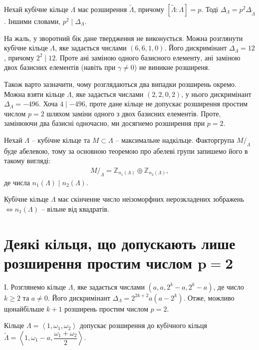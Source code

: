 \documentclass{thesis}
\begin{document}
\begin{proposition}
Нехай кубічне кільце $\Lambda$ має розширення $\tilde{\Lambda}$, причому $[\tilde{\Lambda}: \Lambda] = p$. Тоді $\Delta_\Lambda = p^2 \Delta_{\tilde{\Lambda}}$. Іншими словами, $p^2 \mid \Delta_\Lambda$.
\end{proposition}

На жаль, у зворотний бік дане твердження не виконується. Можна розглянути кубічне кільце $\Lambda$, яке задається числами $(6,6,1,0)$. Його дискримінант $\Delta_\Lambda = 12$, причому $2^2 \mid 12$. Проте ані заміною одного базисного елементу, ані заміною двох базисних елементів (навіть при $\gamma \neq 0$) не виникне розширеня.

Також варто зазначити, чому розглядаються два випадки розширень окремо. Можна взяти кільце $\Lambda$, яке задається числами $(2,2,0,2)$, у нього дискримінант $\Delta_\Lambda = -496$. Хоча $4 \mid -496$, проте дане кільце не допускає розширення простим числом $p=2$ шляхом заміни одного з двох базисних елементів. Проте, замінюючи два базисні одночасно, ми досягнемо розширення при $p=2$.

Нехай $\Lambda$ -- кубічне кільце та $M \subset \Lambda$ -- максимальне надкільце. Факторгрупа $M/_\Lambda$ буде абелевою, тому за основною теоремою про абелеві групи запишемо його в такому вигляді:
\begin{align*}
M/_\Lambda = \mathbb{Z}_{n_1(\Lambda)} \oplus \mathbb{Z}_{n_2(\Lambda)},
\end{align*}
де числа $n_1(\Lambda) \mid n_2(\Lambda)$.

\begin{theorem}
\label{integral_representation_theorem}
Кубічне кільце $\Lambda$ має скінченне число неізоморфних нерозкладених зображень $\iff n_1(\Lambda)$ -- вільне від квадратів.
\end{theorem}

\section{Деякі кільця, що допускають лише розширення простим числом $\boldsymbol{p = 2}$}
I. Розглянемо кільце $\Lambda$, яке задається числами $(a,a,2^k-a,2^k-a)$, де число $k \geq 2$ та $a \neq 0$. Його дискримінант $\Delta_\Lambda = 2^{2k+2}a(a-2^k)$. Отже, можливо щонайбільше $k+1$ розширень простим числом $p = 2$.

\begin{lemma}
Кільце $\Lambda = \left<1,\omega_1,\omega_2\right>$ допускає розширення до кубічного кільця $\tilde{\Lambda} = \left< 1,\omega_1-a,\dfrac{\omega_1+\omega_2}{2} \right>$.
\end{lemma}
\end{document}
